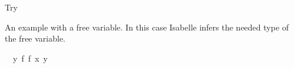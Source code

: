 \begin{isabellebody}
%
\endisadelimdocument
%
\begin{isamarkuptext}%
Try %
\end{isamarkuptext}\isamarkuptrue%
%
\begin{isamarkuptext}%
An example with a free variable. In this case Isabelle infers the needed type of the
  free variable.%
\end{isamarkuptext}\isamarkuptrue%
\isamarkupfalse%
\ {\isachardoublequoteopen}{\isasymlambda}\ y\ f{\isachardot}{\kern0pt}\ f\ {\isacharparenleft}{\kern0pt}x\ y{\isacharparenright}{\kern0pt}{\isachardoublequoteclose}\isanewline
\isanewline
%
\isadelimtheory
\isanewline
%
\endisadelimtheory
%
\isatagtheory
{}\isamarkupfalse%
%
\endisatagtheory
{\isafoldtheory}%
%
\isadelimtheory
%
\endisadelimtheory
%
\end{isabellebody}%
\endinput
